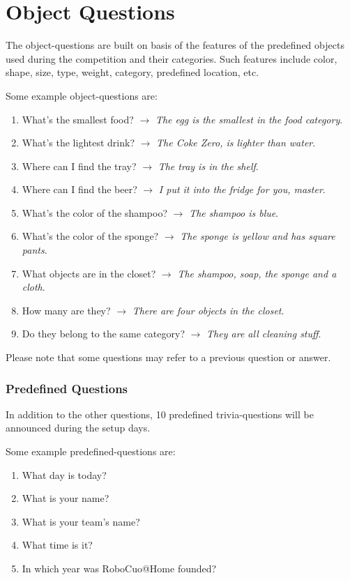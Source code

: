 \section{Object Questions}
The object-questions are built on basis of the features of the predefined objects used during the competition and their categories. Such features include color, shape, size, type, weight, category, predefined location, etc.

Some example object-questions are:
\begin{enumerate}
    \item What's the smallest food? $\rightarrow$ \textit{The egg is the smallest in the food category}.
    \item What's the lightest drink? $\rightarrow$ \textit{The Coke Zero, is lighter than water}.
    \item Where can I find the tray? $\rightarrow$ \textit{The tray is in the shelf}.
    \item Where can I find the beer? $\rightarrow$ \textit{I put it into the fridge for you, master}.
    \item What's the color of the shampoo? $\rightarrow$ \textit{The shampoo is blue}.
    \item What's the color of the sponge? $\rightarrow$ \textit{The sponge is yellow and has square pants}.
    \item What objects are in the closet? $\rightarrow$ \textit{The shampoo, soap, the sponge and a cloth}.
    \item How many are they? $\rightarrow$ \textit{There are four objects in the closet}.
    \item Do they belong to the same category? $\rightarrow$ \textit{They are all cleaning stuff}.
\end{enumerate}

Please note that some questions may refer to a previous question or answer. 

\subsubsection{Predefined Questions}
In addition to the other questions, 10 predefined trivia-questions will be announced during the setup days.

Some example predefined-questions are:
\begin{enumerate}
    \item What day is today?
    \item What is your name?
    \item What is your team's name?
    \item What time is it?
    \item In which year was RoboCuo@Home founded?
\end{enumerate}



